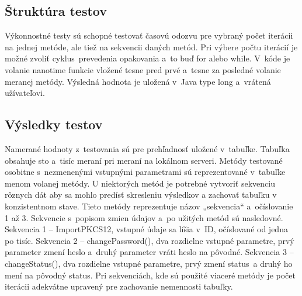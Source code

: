 \documentclass[
  digital, %
  table,   %
oneside,
  nolof,     %
  nolot,     %
]{fithesis3}
\begin{document}
\subsection{Štruktúra testov}
Výkonnostné testy sú schopné testovať časovú odozvu pre vybraný počet iterácii na jednej metóde, ale tiež na sekvencii daných metód. Pri výbere počtu iterácií je možné zvoliť cyklus~prevedenia opakovania a~to buď for alebo while.  V~kóde je  volanie nanotime funkcie vložené tesne pred prvé a~tesne za posledné volanie meranej metódy. Výsledná hodnota je uložená v~Java type long a~vrátená užívateľovi.
\subsection{Výsledky testov}
Namerané hodnoty z~testovania sú pre prehľadnosť uložené v~tabuľke. Tabuľka obsahuje sto a~tisíc meraní pri meraní na lokálnom serveri. Metódy testované osobitne s~nezmenenými vstupnými parametrami sú reprezentované v~tabuľke menom volanej metódy. U niektorých metód je potrebné vytvoriť sekvenciu rôznych dát aby sa mohlo predísť skresleniu výsledkov a zachovať tabuľku v konzistentnom stave. Tieto metódy reprezentuje názov „sekvencia“ a~očíslovanie 1 až 3. Sekvencie s~popisom zmien údajov  a~po užitých metód sú nasledovné.
Sekvencia 1 – ImportPKCS12, vstupné údaje sa líšia v~ID, očíslované od jedna po tisíc.
Sekvencia 2 – changePassword(), dva rozdielne vstupné parametre, prvý parameter zmení heslo  a~druhý parameter vráti heslo na pôvodné.
Sekvencia 3 – changeStatus(), dva rozdielne vstupné parametre, prvý zmení status~a druhý ho mení na pôvodný status. 
Pri sekvenciách, kde sú použité viaceré metódy je počet iterácii adekvátne upravený pre zachovanie nemennosti tabuľky. 

\begin{table}[htbp]
	\begin{center}
	\end{center}
	\caption{Ukážka nameraných hodnôt}
	\label{table:power}
\end{table}
\end{document}

